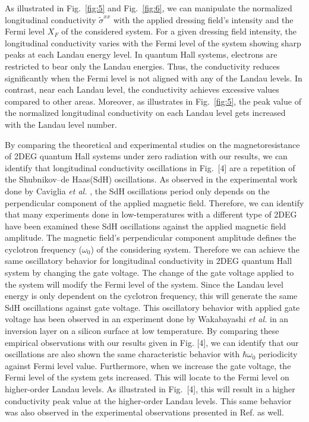 \documentclass[
 reprint,
 amsmath,amssymb,
 aps,
 prb,
]{revtex4-2}
\begin{document}
As illustrated in Fig.~\ref{fig:5} and Fig.~\ref{fig:6}, we can manipulate the normalized longitudinal conductivity $\widetilde{\sigma}^{xx}$ with the applied dressing field's intensity and the Fermi level $X_F$ of the considered system.
For a given dressing field intensity, the longitudinal conductivity varies with  the Fermi level of the system showing sharp peaks at each Landau energy level.
In quantum Hall systems, electrons are restricted to bear only the Landau energies. Thus, the conductivity reduces significantly when the Fermi level is not aligned with any of the Landau levels. In contrast, near each Landau level, the conductivity achieves excessive values compared to other areas. Moreover, as illustrates in Fig.~\ref{fig:5}, the peak value of the normalized longitudinal conductivity on each Landau level gets increased with the Landau level number.

{\color{Red}
By comparing the theoretical \cite{ando72,ando74_1,ando74_2,ando74_3,ando74_4,ando82,endo09} and experimental \cite{endo09,wakabayashi78,ochiai190,mancoff96,arapov02,grbic04,caviglia10} studies on the magnetoresistance of 2DEG quantum Hall systems under zero radiation with our results, we can identify that longitudinal conductivity oscillations in Fig.~[4] are a repetition of the Shubnikov–de Haas(SdH) oscillations.
As observed in the experimental work done by Caviglia \textit{et al.} \cite{caviglia10}, the SdH oscillations period only depends on the perpendicular component of the applied magnetic field.
Therefore, we can identify that many experiments done in low-temperatures \cite{endo09,ochiai190,mancoff96,arapov02,grbic04,caviglia10} with a different type of 2DEG have been examined these SdH oscillations against the applied magnetic field amplitude.
The magnetic field's perpendicular component amplitude defines the cyclotron frequency ($\omega_0$) of the considering system.
Therefore we can achieve the same oscillatory behavior for longitudinal conductivity in 2DEG quantum Hall system by changing the gate voltage. The  change of the gate voltage applied to the system will modify the Fermi level of the system.
Since the Landau level energy is only dependent on the cyclotron frequency, this will generate the same SdH oscillations against gate voltage.
This oscillatory behavior with applied gate voltage has been observed in an  experiment done by Wakabayashi \textit{et al.} \cite{wakabayashi78} in an inversion layer on a silicon surface at low temperature. By comparing these empirical observations with our results given in Fig. [4], we can identify that our oscillations are also shown the same characteristic behavior with $\hbar\omega_0$ periodicity against Fermi level value. Furthermore, when we increase the gate voltage, the Fermi level of the system gets increased. This will locate to the Fermi level on higher-order Landau levels. As illustrated in Fig.~[4], this will result in a higher conductivity peak value at the higher-order Landau levels. This same behavior was also observed in the experimental observations presented in Ref. \cite{wakabayashi78} as well.}
\end{document}
